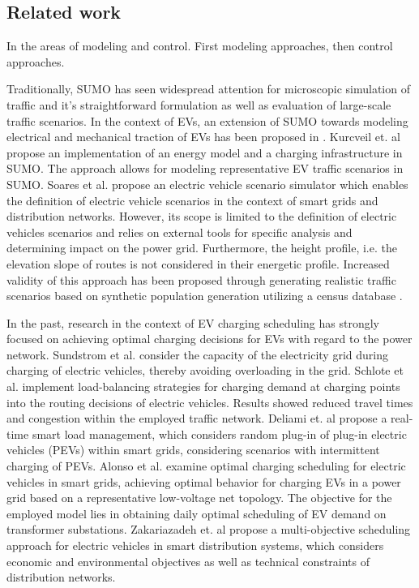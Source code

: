 \subsection{Related work}

In the areas of modeling and control. First modeling approaches, then control approaches.

Traditionally, SUMO \cite{behrisch2011sumo} has seen widespread attention for microscopic simulation of traffic and it's straightforward formulation as well as evaluation of large-scale traffic scenarios. In the context of EVs, an extension of SUMO towards modeling electrical and mechanical traction of EVs has been proposed in \cite{maia2011electric}. Kurcveil et. al \cite{kurczveil2014implementation} propose an implementation of an energy model and a charging infrastructure in SUMO. The approach allows for modeling representative EV traffic scenarios in SUMO. Soares et al. \cite{soares2012electric} propose an electric vehicle scenario simulator which enables the definition of electric vehicle scenarios in the context of smart grids and distribution networks. However, its scope is limited to the definition of electric vehicles scenarios and relies on external tools for specific analysis and determining impact on the power grid. Furthermore, the height profile, i.e. the elevation slope of routes is not considered in their energetic profile. Increased validity of this approach has been proposed through generating realistic traffic scenarios based on synthetic population generation utilizing a census database \cite{soares2014realistic}.

In the past, research in the context of EV charging scheduling has strongly focused on achieving optimal charging decisions for EVs with regard to the power network. Sundstrom et al. \cite{sundstrom2010planning} consider the capacity of the electricity grid during charging of electric vehicles, thereby avoiding overloading in the grid. Schlote et al. \cite{schlote2012balanced} implement load-balancing strategies for charging demand at charging points into the routing decisions of electric vehicles. Results showed reduced travel times and congestion within the employed traffic network. Deliami et. al \cite{deilami2011real} propose a real-time smart load management, which considers random plug-in of plug-in electric vehicles (PEVs) within smart grids, considering scenarios with intermittent charging of PEVs. Alonso et al. \cite{alonso2014optimal} examine optimal charging scheduling for electric vehicles in smart grids, achieving optimal behavior for charging EVs in a power grid based on a representative low-voltage net topology. The objective for the employed model lies in obtaining daily optimal scheduling of EV demand on transformer substations. Zakariazadeh et. al \cite{zakariazadeh2014multi} propose a multi-objective scheduling approach for electric vehicles in smart distribution systems, which considers economic and environmental objectives as well as technical constraints of distribution networks.

